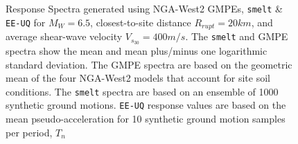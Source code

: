 \begin{figure}[!htbp]
  \caption{Response Spectra generated using NGA-West2 GMPEs,
    \texttt{smelt} \& \texttt{EE-UQ} for $M_W = 6.5$, closest-to-site
    distance $R_{rupt} = 20km$, and average shear-wave velocity $V_{s_{30}} =
    400m/s$. The \texttt{smelt} and GMPE spectra show the mean and
    mean plus/minus one logarithmic standard deviation. The GMPE
    spectra are based on the geometric mean of the four NGA-West2
    models that account for site soil conditions. The \texttt{smelt}
    spectra are based on an ensemble of 1000 synthetic ground
    motions. \texttt{EE-UQ} response values are based on the mean
    pseudo-acceleration for 10 synthetic ground motion samples per
    period, $T_n$}
  \label{fig:stochastic_validation}
\end{figure}
